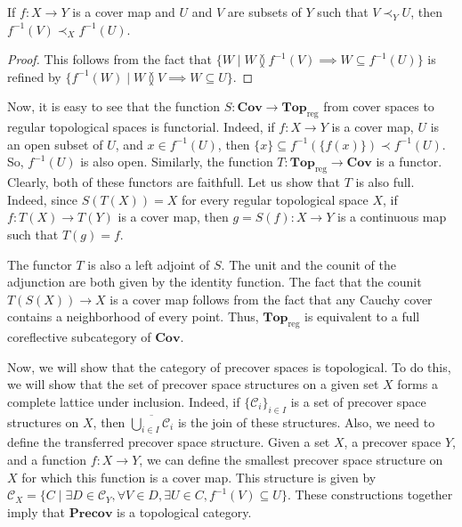 \documentclass[reqno]{amsart}
\theoremstyle{definition}
\theoremstyle{remark}
\numberwithin{figure}{section}
\newcommand{\overlap}[2]{#1 \between #2}
\newcommand{\rb}{\prec}
\newcommand{\cat}[1]{\mathbf{#1}}
\begin{document}
\begin{lem}
If $f : X \to Y$ is a cover map and $U$ and $V$ are subsets of $Y$ such that $V \rb_Y U$, then $f^{-1}(V) \rb_X f^{-1}(U)$.
\end{lem}
\begin{proof}
This follows from the fact that $\{ W \mid \overlap{W}{f^{-1}(V)} \implies W \subseteq f^{-1}(U) \}$ is refined by $\{ f^{-1}(W) \mid \overlap{W}{V} \implies W \subseteq U \}$.
\end{proof}

Now, it is easy to see that the function $S : \cat{Cov} \to \cat{Top}_\mathrm{reg}$ from cover spaces to regular topological spaces is functorial.
Indeed, if $f : X \to Y$ is a cover map, $U$ is an open subset of $U$, and $x \in f^{-1}(U)$, then $\{ x \} \subseteq f^{-1}(\{ f(x) \}) \rb f^{-1}(U)$.
So, $f^{-1}(U)$ is also open.
Similarly, the function $T : \cat{Top}_\mathrm{reg} \to \cat{Cov}$ is a functor.
Clearly, both of these functors are faithfull.
Let us show that $T$ is also full.
Indeed, since $S(T(X)) = X$ for every regular topological space $X$, if $f : T(X) \to T(Y)$ is a cover map, then $g = S(f) : X \to Y$ is a continuous map such that $T(g) = f$.

The functor $T$ is also a left adjoint of $S$.
The unit and the counit of the adjunction are both given by the identity function.
The fact that the counit $T(S(X)) \to X$ is a cover map follows from the fact that any Cauchy cover contains a neighborhood of every point.
Thus, $\cat{Top}_\mathrm{reg}$ is equivalent to a full coreflective subcategory of $\cat{Cov}$.

Now, we will show that the category of precover spaces is topological. %
To do this, we will show that the set of precover space structures on a given set $X$ forms a complete lattice under inclusion.
Indeed, if $\{ \mathcal{C}_i \}_{i \in I}$ is a set of precover space structures on $X$, then $\overline{\bigcup_{i \in I} \mathcal{C}_i}$ is the join of these structures.
Also, we need to define the transferred precover space structure.
Given a set $X$, a precover space $Y$, and a function $f : X \to Y$, we can define the smallest precover space structure on $X$ for which this function is a cover map.
This structure is given by $\mathcal{C}_X = \{ C \mid \exists D \in \mathcal{C}_Y, \forall V \in D, \exists U \in C, f^{-1}(V) \subseteq U \}$.
These constructions together imply that $\cat{Precov}$ is a topological category.
\end{document}
